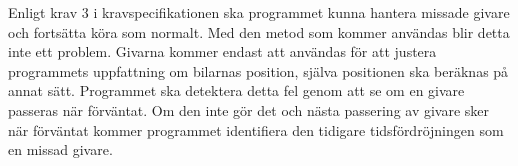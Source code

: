 Enligt krav 3 i kravspecifikationen ska programmet kunna hantera missade givare
och fortsätta köra som normalt. Med den metod som kommer användas blir detta inte ett problem.
Givarna kommer endast att användas för att justera programmets uppfattning om bilarnas position, 
själva positionen ska beräknas på annat sätt.  Programmet ska detektera detta
fel genom att  se om en givare passeras när förväntat. Om den inte gör det och nästa
passering av givare sker när förväntat kommer programmet
identifiera den tidigare tidsfördröjningen som en missad givare.
